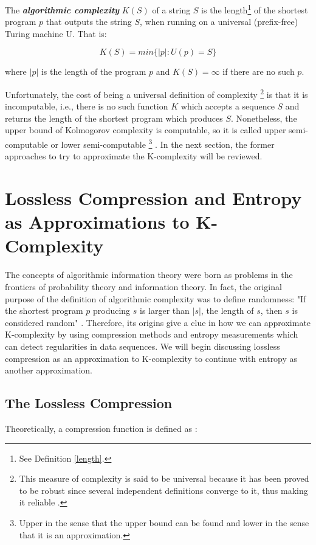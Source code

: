 \begin{defn}
\label{k_complexity_formal_def}
The \textbf{\textit{algorithmic complexity}} $K(S)$ of a string $S$ is the length\footnote{See Definition \ref{length}.} of the shortest program $p$ that outputs the string $S$, when running on a universal (prefix-free) Turing machine U. That is:

\begin{equation}
  K(S)=min \{ |p| : U(p)=S \}
\end{equation}

where $|p|$ is the length of the program $p$ and $K(S)= \infty $ if there are no such $p$.
\end{defn}

Unfortunately, the cost of being a universal definition of complexity \footnote{This measure of complexity is said to be universal because it has been proved to be robust since several independent definitions converge to it, thus making it reliable \cite{kolmo_calculating}.} is that it is incomputable, i.e., there is no such function $K$ which accepts a sequence $S$ and returns the length of the shortest program which produces $S$. Nonetheless, the upper bound of Kolmogorov complexity is computable, so it is called upper semi-computable or lower semi-computable \footnote{Upper in the sense that the upper bound can be found and lower in the sense that it is an approximation.} \cite{decomposition}. In the next section, the former approaches to try to approximate the K-complexity will be reviewed.

\section{Lossless Compression and Entropy as Approximations to K-Complexity}
The concepts of algorithmic information theory were born as problems in the frontiers of probability theory and information theory. In fact, the original purpose of the definition of algorithmic complexity was to define randomness: "If the shortest program $p$ producing $s$ is larger than $|s|$, the length of $s$, then $s$ is considered random" \cite{kolmo_calculating}. Therefore, its origins give a clue in how we can approximate K-complexity by using compression methods and entropy measurements which can detect regularities in data sequences. We will begin discussing lossless compression as an approximation to K-complexity to continue with entropy as another approximation.

\subsection{The Lossless Compression}
Theoretically, a compression function is defined as \cite{kolmo_compression}:

